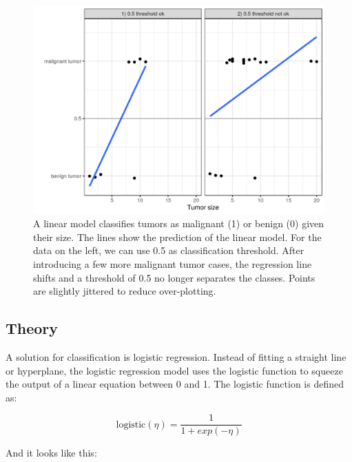 \documentclass[12pt,]{krantz}
\begin{document}
\begin{figure}

{\centering \includegraphics[width=\textwidth]{images/linear-class-threshold-1} 

}

\caption{A linear model classifies tumors as malignant (1) or benign (0) given their size. The lines show the prediction of the linear model. For the data on the left, we can use 0.5 as classification threshold. After introducing a few more malignant tumor cases, the regression line shifts and a threshold of 0.5 no longer separates the classes. Points are slightly jittered to reduce over-plotting. }\label{fig:linear-class-threshold}
\end{figure}

\subsection{Theory}\label{theory}

A solution for classification is logistic regression. Instead of fitting
a straight line or hyperplane, the logistic regression model uses the
logistic function to squeeze the output of a linear equation between 0
and 1. The logistic function is defined as:

\[\text{logistic}(\eta)=\frac{1}{1+exp(-\eta)}\]

And it looks like this:
\end{document}
